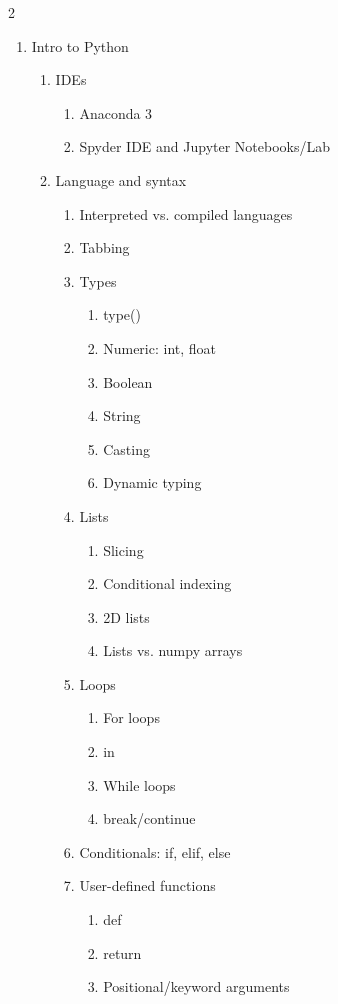 \documentclass{article}
\begin{document}
\begin{multicols}{2}
\begin{enumerate}
	\item Intro to Python
	\begin{enumerate}
		\item IDEs
		\begin{enumerate}
			\item Anaconda 3
			\item Spyder IDE and Jupyter Notebooks/Lab
		\end{enumerate}
		\item Language and syntax
		\begin{enumerate}
			\item Interpreted vs. compiled languages
			\item Tabbing
			\item Types
			\begin{enumerate}
				\item type()
				\item Numeric: int, float
				\item Boolean
				\item String
				\item Casting
				\item Dynamic typing
			\end{enumerate}
			\item Lists
			\begin{enumerate}
				\item Slicing
				\item Conditional indexing
				\item 2D lists
				\item Lists vs. numpy arrays
			\end{enumerate}
			\item Loops
			\begin{enumerate}
				\item For loops
				\item in
				\item While loops
				\item break/continue
			\end{enumerate}
			\item Conditionals: if, elif, else
			\item User-defined functions
			\begin{enumerate}
				\item def
				\item return
				\item Positional/keyword arguments
			\end{enumerate}	

\end{enumerate}
\end{enumerate}
\end{enumerate}
\end{multicols}
\end{document}
